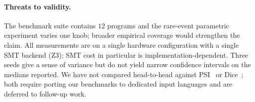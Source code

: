 \paragraph{Threats to validity.}
The benchmark suite contains $12$ programs and the rare-event
parametric experiment varies one knob; broader empirical coverage
would strengthen the claim.  All measurements are on a single
hardware configuration with a single SMT backend (Z3); SMT cost in
particular is implementation-dependent.  Three seeds give a sense of
variance but do not yield narrow confidence intervals on the medians
reported.  We have not compared head-to-head against PSI~\cite{psi}
or Dice~\cite{holtzen2020dice}; both require porting our benchmarks
to dedicated input languages and are deferred to follow-up work.
